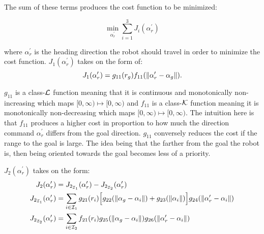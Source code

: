 The sum of these terms produces the cost function to be minimized:

\begin{equation}
	\min_{\alpha_r^\prime} \sum_{i = 1}^3 J_{i}(\alpha_r^\prime)
\end{equation}

where $\alpha_r^\prime$ is the heading direction the robot should travel in order to minimize the cost function. 
$J_1(\alpha_r^\prime)$ takes on the form of:
\begin{equation}
	J_1(\alpha_r^\prime) = g_{11}(r_g) f_{11}( \left\lVert\alpha_r^\prime - \alpha_g\right\rVert ).
\end{equation}

$g_{11}$ is a class-${\cal L}$ function meaning that it is continuous and monotonically non-increasing which maps $[0, \infty) \mapsto [0,\infty)$
and $f_{11}$ is a class-${\cal K}$
function meaning it is monotonically non-decreasing which maps $[0, \infty) \mapsto [0,\infty)$. 
The intuition here is that $f_{11}$ produces a higher cost in proportion to how much the direction command $\alpha_r^\prime$ differs from the goal direction.
$g_{11}$ conversely reduces the cost if the range to the goal is large. The idea being that the farther from the goal the robot is, then being oriented
towards the goal becomes less of a priority. 

$J_2(\alpha_r^\prime)$ takes on the form:
\begin{align}
	J_2(\alpha_r^\prime) &= J_{2_{{\cal I}_1}}(\alpha_r^\prime) - J_{2_{{\cal I}_2}}(\alpha_r^\prime) \label{eq:j2}\\
	J_{2_{{\cal I}_1}}(\alpha_r^\prime) &= \sum_{i \in {\cal I}_1} g_{21}(r_i)\Big [ g_{22}(\left\lVert\alpha_g - \alpha_i\right\rVert) + g_{23}(\left\lVert\alpha_i\right\rVert) \Big ] g_{24}( \left\lVert\alpha_r^\prime - \alpha_i\right\rVert) 
	\label{eq:j2_i1}\\
	J_{2_{{\cal I}_2}}(\alpha_r^\prime) &= \sum_{i \in {\cal I}_2} f_{21}(r_i) g_{25}(\left\lVert\alpha_g - \alpha_i\right\rVert) g_{26}( \left\lVert\alpha_r^\prime - \alpha_i\right\rVert) \label{eq:j2_i2} 
\end{align}

